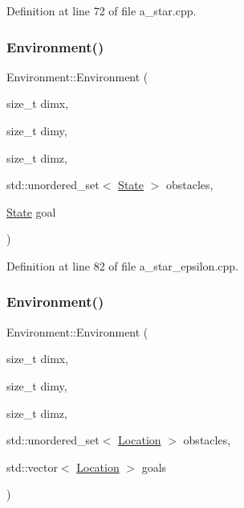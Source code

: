 Definition at line 72 of file a\+\_\+star.\+cpp.

\mbox{\label{class_environment_aa5836d453e17e782e72d48437799e12d}} 
\subsubsection{\texorpdfstring{Environment()}{Environment()}\hspace{0.1cm}{\footnotesize\ttfamily [2/6]}}
{\footnotesize\ttfamily Environment\+::\+Environment (\begin{DoxyParamCaption}\item[{size\+\_\+t}]{dimx,  }\item[{size\+\_\+t}]{dimy,  }\item[{size\+\_\+t}]{dimz,  }\item[{std\+::unordered\+\_\+set$<$ \hyperlink{struct_state}{State} $>$}]{obstacles,  }\item[{\hyperlink{struct_state}{State}}]{goal }\end{DoxyParamCaption})\hspace{0.3cm}{\ttfamily [inline]}}



Definition at line 82 of file a\+\_\+star\+\_\+epsilon.\+cpp.

\mbox{\label{class_environment_a12b8baed8e6090b3eb528a27b1fecd0a}} 
\subsubsection{\texorpdfstring{Environment()}{Environment()}\hspace{0.1cm}{\footnotesize\ttfamily [3/6]}}
{\footnotesize\ttfamily Environment\+::\+Environment (\begin{DoxyParamCaption}\item[{size\+\_\+t}]{dimx,  }\item[{size\+\_\+t}]{dimy,  }\item[{size\+\_\+t}]{dimz,  }\item[{std\+::unordered\+\_\+set$<$ \hyperlink{struct_location}{Location} $>$}]{obstacles,  }\item[{std\+::vector$<$ \hyperlink{struct_location}{Location} $>$}]{goals }\end{DoxyParamCaption})\hspace{0.3cm}{\ttfamily [inline]}}



